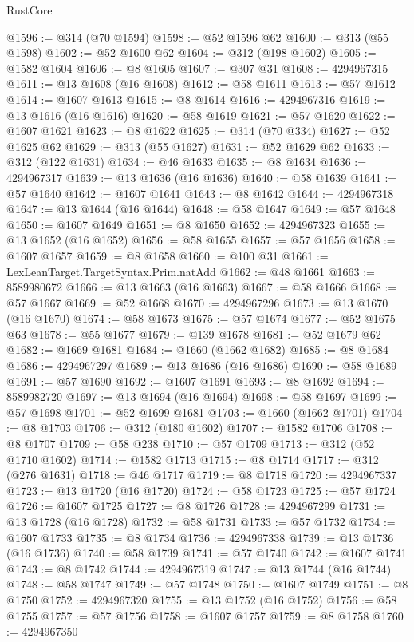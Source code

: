 \begin{lexlean}{RustCore}
\begin{coremodule}
@1596 := @314 (@70 @1594)
@1598 := @52 @1596 @62
@1600 := @313 (@55 @1598)
@1602 := @52 @1600 @62
@1604 := @312 (@198 @1602)
@1605 := @1582 @1604
@1606 := @8 @1605
@1607 := @307 @31
@1608 := 4294967315
@1611 := @13 @1608 (@16 @1608)
@1612 := @58 @1611
@1613 := @57 @1612
@1614 := @1607 @1613
@1615 := @8 @1614
@1616 := 4294967316
@1619 := @13 @1616 (@16 @1616)
@1620 := @58 @1619
@1621 := @57 @1620
@1622 := @1607 @1621
@1623 := @8 @1622
@1625 := @314 (@70 @334)
@1627 := @52 @1625 @62
@1629 := @313 (@55 @1627)
@1631 := @52 @1629 @62
@1633 := @312 (@122 @1631)
@1634 := @46 @1633
@1635 := @8 @1634
@1636 := 4294967317
@1639 := @13 @1636 (@16 @1636)
@1640 := @58 @1639
@1641 := @57 @1640
@1642 := @1607 @1641
@1643 := @8 @1642
@1644 := 4294967318
@1647 := @13 @1644 (@16 @1644)
@1648 := @58 @1647
@1649 := @57 @1648
@1650 := @1607 @1649
@1651 := @8 @1650
@1652 := 4294967323
@1655 := @13 @1652 (@16 @1652)
@1656 := @58 @1655
@1657 := @57 @1656
@1658 := @1607 @1657
@1659 := @8 @1658
@1660 := @100 @31
@1661 := LexLeanTarget.TargetSyntax.Prim.natAdd
@1662 := @48 @1661
@1663 := 8589980672
@1666 := @13 @1663 (@16 @1663)
@1667 := @58 @1666
@1668 := @57 @1667
@1669 := @52 @1668
@1670 := 4294967296
@1673 := @13 @1670 (@16 @1670)
@1674 := @58 @1673
@1675 := @57 @1674
@1677 := @52 @1675 @63
@1678 := @55 @1677
@1679 := @139 @1678
@1681 := @52 @1679 @62
@1682 := @1669 @1681
@1684 := @1660 (@1662 @1682)
@1685 := @8 @1684
@1686 := 4294967297
@1689 := @13 @1686 (@16 @1686)
@1690 := @58 @1689
@1691 := @57 @1690
@1692 := @1607 @1691
@1693 := @8 @1692
@1694 := 8589982720
@1697 := @13 @1694 (@16 @1694)
@1698 := @58 @1697
@1699 := @57 @1698
@1701 := @52 @1699 @1681
@1703 := @1660 (@1662 @1701)
@1704 := @8 @1703
@1706 := @312 (@180 @1602)
@1707 := @1582 @1706
@1708 := @8 @1707
@1709 := @58 @238
@1710 := @57 @1709
@1713 := @312 (@52 @1710 @1602)
@1714 := @1582 @1713
@1715 := @8 @1714
@1717 := @312 (@276 @1631)
@1718 := @46 @1717
@1719 := @8 @1718
@1720 := 4294967337
@1723 := @13 @1720 (@16 @1720)
@1724 := @58 @1723
@1725 := @57 @1724
@1726 := @1607 @1725
@1727 := @8 @1726
@1728 := 4294967299
@1731 := @13 @1728 (@16 @1728)
@1732 := @58 @1731
@1733 := @57 @1732
@1734 := @1607 @1733
@1735 := @8 @1734
@1736 := 4294967338
@1739 := @13 @1736 (@16 @1736)
@1740 := @58 @1739
@1741 := @57 @1740
@1742 := @1607 @1741
@1743 := @8 @1742
@1744 := 4294967319
@1747 := @13 @1744 (@16 @1744)
@1748 := @58 @1747
@1749 := @57 @1748
@1750 := @1607 @1749
@1751 := @8 @1750
@1752 := 4294967320
@1755 := @13 @1752 (@16 @1752)
@1756 := @58 @1755
@1757 := @57 @1756
@1758 := @1607 @1757
@1759 := @8 @1758
@1760 := 4294967350

\end{coremodule}
\end{lexlean}
